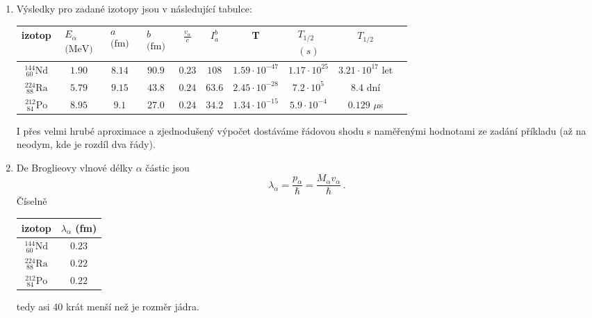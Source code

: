 \begin{solution}
\begin{enumerate}
	\item
		Výsledky pro zadané izotopy jsou v následující tabulce:
		\begin{center}
			\begin{tabular}{|c|c|c|c|c|c|c|c|c|c|}
				\hline
				izotop & $\begin{array}{c}E_{\alpha} \\ \text{(MeV)}\end{array}$ & $\begin{array}{c}a \\ \text{(fm)}\end{array}$ & $\begin{array}{c}b \\ \text{(fm)}\end{array}$ 
				& $\frac{v_{\alpha}}{c}$ & $I_{a}^{b}$ & T & $\begin{array}{c}T_{1/2} \\ (s)\end{array}$ & $T_{1/2}$ \\
				\hline
				\hline
				$^{144}_{\ 60}{\text{Nd}}$ & $1.90$ & $8.14$ & $90.9$ & $0.23$ & $108$ & $1.59\cdot10^{-47}$ & $1.17\cdot10^{25}$ & $3.21\cdot10^{17}$ let \\
				\hline
				$^{224}_{\ 88}{\text{Ra}}$ & $5.79$ & $9.15$ & $43.8$ & $0.24$ & $63.6$ & $2.45\cdot10^{-28}$ & $7.2\cdot10^{5}$ & $8.4$ dní \\
				\hline
				$^{212}_{\ 84}{\text{Po}}$ & $8.95$ & $9.1$ & $27.0$ & $0.24$ & $34.2$ & $1.34\cdot10^{-15}$ & $5.9\cdot10^{-4}$ & $0.129$ $\mu$s\\
				\hline
			\end{tabular}
		\end{center}
		I přes velmi hrubé aproximace a zjednodušený výpočet dostáváme řádovou shodu s naměřenými hodnotami ze zadání příkladu (až na neodym, kde je rozdíl dva řády).
		
	\item
		De Broglieovy vlnové délky $\alpha$ částic jsou
		\begin{equation}
			\lambda_{\alpha}=\frac{p_{\alpha}}{\hbar}=\frac{M_{\alpha}v_{\alpha}}{\hbar}\,.
		\end{equation}
		Číselně
		\begin{center}
			\begin{tabular}{|c|c|}
				\hline
				izotop & $\lambda_{\alpha}$ (fm) \\
				\hline
				\hline
				$^{144}_{\ 60}{\text{Nd}}$ & $0.23$ \\
				\hline
				$^{224}_{\ 88}{\text{Ra}}$ & $0.22$ \\
				\hline
				$^{212}_{\ 84}{\text{Po}}$ & $0.22$ \\
				\hline
			\end{tabular}
		\end{center}
		tedy asi 40 krát menší než je rozměr jádra.				
	\end{enumerate}


\end{solution}
